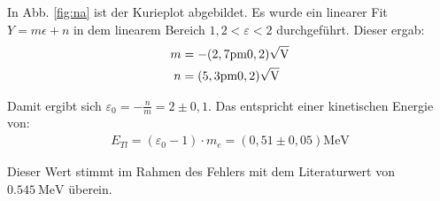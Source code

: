 In Abb. \ref{fig:na} ist der Kurieplot abgebildet. Es wurde ein linearer Fit $Y = m \epsilon + n$ in dem linearem Bereich $1,2 < \varepsilon < 2$ durchgeführt. Dieser ergab:
\begin{align*}
m &= -\si{(2,7\pm 0,2) \sqrt{\volt}}\\
n &= \si{(5,3 \pm 0,2) \sqrt{\volt}}
\end{align*}

Damit ergibt sich $\varepsilon_0 = -\frac{n}{m} = 2 \pm 0,1$. Das entspricht einer kinetischen Energie von:
\begin{align*}
E_{Tl} = (\varepsilon_0 - 1)\cdot m_e = \si{(0,51 \pm 0,05)\mega\eV}
\end{align*}

Dieser Wert stimmt im Rahmen des Fehlers mit dem Literaturwert\cite{naenergy} von $\SI{0,545}{\mega\eV}$ überein.
